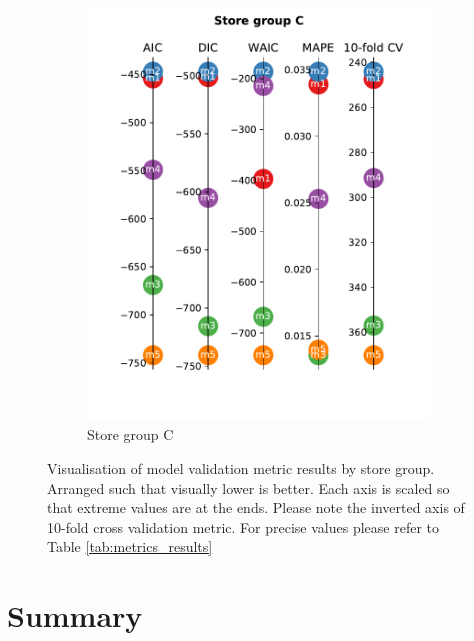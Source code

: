 \documentclass[english, 12pt, a4paper, sci, utf8, a-1b, online]{aaltothesis}
\begin{document}
\begin{figure}
	\begin{subfigure}[htb]{0.5\textwidth}
		\centering
		\includegraphics[width=\textwidth]{../plots/metrics/metrics_plot_C.pdf}
		\caption{Store group C}
		\label{fig:metrics_C}
	\end{subfigure}
	\caption{\label{fig:metrics_visualization}Visualisation of model validation metric results by store group. Arranged such that visually lower is better.
	Each axis is scaled so that extreme values are at the ends. Please note the inverted axis of 10-fold cross validation metric. For 
	precise values please refer to Table \ref{tab:metrics_results}}
\end{figure}






\section{Summary} 

\end{document}
